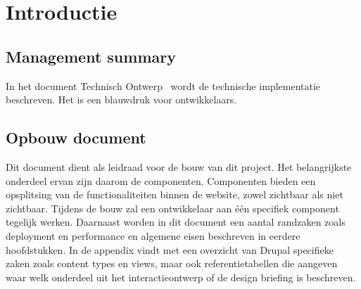 
\section{Introductie}

\subsection{Management summary}
In het document Technisch Ontwerp \customerdomain \ wordt de technische implementatie beschreven. Het is een blauwdruk voor ontwikkelaars. 

\subsection{Opbouw document}
Dit document dient als leidraad voor de bouw van dit project. Het belangrijkste onderdeel ervan zijn daarom de componenten. Componenten bieden een opsplitsing van de functionaliteiten binnen de website, zowel zichtbaar als niet zichtbaar. Tijdens de bouw zal een ontwikkelaar aan \'{e}\'{e}n specifiek component tegelijk werken. Daarnaast worden in dit document een aantal randzaken zoals deployment en performance en algemene eisen beschreven in eerdere hoofdstukken. In de appendix vindt met een overzicht van Drupal specifieke zaken zoals content types en views, maar ook referentietabellen die aangeven waar welk onderdeel uit het interactieontwerp of de design briefing is beschreven.
